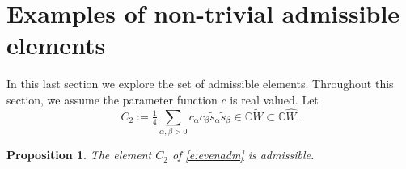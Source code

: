\documentclass[pdftex]{sigma}
\numberwithin{equation}{section}
\newtheorem{Proposition}[Theorem]{Proposition}
 { \theoremstyle{definition}
\newtheorem{Definition}[Theorem]{Definition}
\newtheorem{Note}[Theorem]{Note}
\newtheorem{Example}[Theorem]{Example}
\newtheorem{Remark}[Theorem]{Remark} }
\newcommand{\bbc}{\mathbb{C}}
\begin{document}
\section{Examples of non-trivial admissible elements}\label{s:AdmElem}

In this last section we explore the set of admissible elements. Throughout this section, we assume the parameter function $c$ is real valued. Let
\begin{equation}\label{e:evenadm}
C_2 := \tfrac{1}{4}\sum_{\alpha,\beta>0}c_\alpha c_\beta \tilde{s}_\alpha\tilde{s}_\beta \in \bbc\tilde W\subset \bbc\hat{W}.
\end{equation}

\begin{Proposition}
The element $C_2$ of \eqref{e:evenadm} is admissible.
\end{Proposition}
\end{document}
